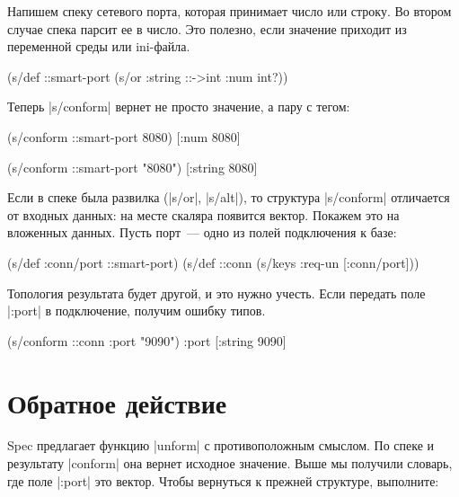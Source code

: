 Напишем спеку сетевого порта, которая принимает число или строку. Во втором
случае спека парсит ее в число. Это полезно, если значение приходит из
переменной среды или ini-файла.

\begin{english}
  \begin{clojure}
(s/def ::smart-port
  (s/or :string ::->int :num int?))
  \end{clojure}
\end{english}

Теперь \spverb|s/conform| вернет не просто значение, а пару с тегом:

\begin{english}
  \begin{clojure}
(s/conform ::smart-port 8080)
[:num 8080]

(s/conform ::smart-port "8080")
[:string 8080]
  \end{clojure}
\end{english}

Если в спеке была развилка (\spverb|s/or|, \spverb|s/alt|), то структура
\spverb|s/conform| отличается от входных данных: на месте скаляра появится
вектор. Покажем это на вложенных данных. Пусть порт~--- одно из полей
подключения к базе:

\begin{english}
  \begin{clojure}
(s/def :conn/port ::smart-port)
(s/def ::conn
  (s/keys :req-un [:conn/port]))
  \end{clojure}
\end{english}

Топология результата будет другой, и это нужно учесть. Если передать поле
\spverb|:port| в подключение, получим ошибку типов.

\begin{english}
  \begin{clojure}
(s/conform ::conn {:port "9090"})
{:port [:string 9090]}
  \end{clojure}
\end{english}

\section{Обратное действие}

Spec предлагает функцию \spverb|unform| с противоположным смыслом. По спеке и
результату \spverb|conform| она вернет исходное значение. Выше мы получили
словарь, где поле \spverb|:port| это вектор. Чтобы вернуться к прежней структуре,
выполните:

